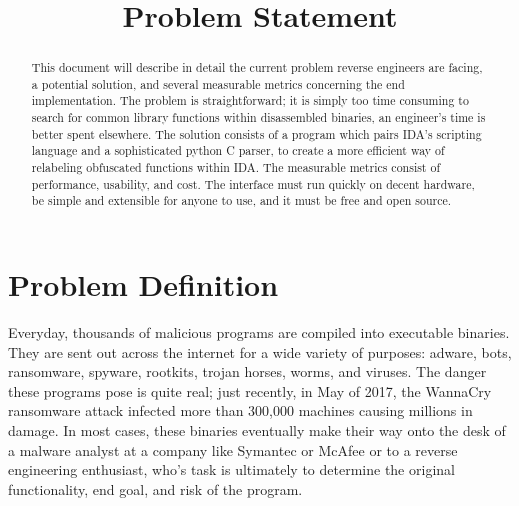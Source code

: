 \documentclass[10pt, draftclsnofoot, letterpaper, margin=.75in, onecolumn]{IEEEtran}
\begin{document}
\renewcommand{\familydefault}{\sfdefault}

\title{Problem Statement}
\author{
}

\begin{titlepage}
\maketitle
\begin{abstract}
This document will describe in detail the current problem reverse engineers are facing, a potential solution, and several measurable metrics concerning the end implementation. The problem is straightforward; it is simply too time consuming to search for common library functions within disassembled binaries, an engineer's time is better spent elsewhere. The solution consists of a program which pairs IDA's scripting language and a sophisticated python C parser, to create a more efficient way of relabeling obfuscated functions within IDA. The measurable metrics consist of performance, usability, and cost. The interface must run quickly on decent hardware, be simple and extensible for anyone to use, and it must be free and open source.
\end{abstract}

\end{titlepage}


\section{Problem Definition}
Everyday, thousands of malicious programs are compiled into executable binaries. They are sent out across the internet for a wide variety of purposes: adware, bots, ransomware, spyware, rootkits, trojan horses, worms, and viruses. The danger these programs pose is quite real; just recently, in May of 2017, the WannaCry ransomware attack infected more than 300,000 machines causing millions in damage. In most cases, these binaries eventually make their way onto the desk of a malware analyst at a company like Symantec or McAfee or to a reverse engineering enthusiast, who's task is ultimately to determine the original functionality, end goal, and risk of the program.\\
\end{document}
